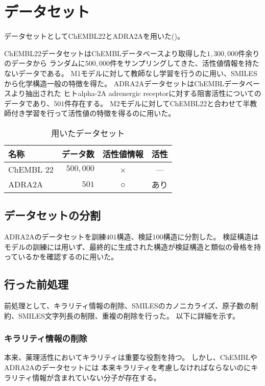 \section{データセット}

データセットとしてChEMBL22とADRA2Aを用いた()。

ChEMBL22データセットはChEMBLデータベース\cite{chembl22}より取得した$1,300,000$件余りのデータから
ランダムに$500,000$件をサンプリングしてきた、活性値情報を持たないデータである。
M1モデルに対して教師なし学習を行うのに用い、SMILESから化学構造一般の特徴を得た。
ADRA2AデータセットはChEMBLデータベースより抽出された
ヒトalpha-2A adrenergic receptorに対する阻害活性についてのデータであり、$501$件存在する。
M2モデルに対してChEMBL22と合わせて半教師付き学習を行って活性値の特徴を得るのに用いた。
\begin{table}[tbp]
    \centering
    \caption{用いたデータセット} \label{tb:dataset}
    \begin{tabular}{lrcc}\hline
      名称 & データ数 & 活性値情報 & 活性\\\hline
      ChEMBL 22 & $500,000$ & × & --- \\
      ADRA2A & $501$ & ○ & あり \\\hline
    \end{tabular}
\end{table}

\subsection{データセットの分割}

ADRA2Aのデータセットを訓練$401$構造、検証$100$構造に分割した。
検証構造はモデルの訓練には用いず、最終的に生成された構造が検証構造と類似の骨格を持っているかを確認するのに用いた。

\subsection{行った前処理}

前処理として、キラリティ情報の削除、SMILESのカノニカライズ、原子数の制約、SMILES文字列長の制限、重複の削除を行った。
以下に詳細を示す。

\subsubsection{キラリティ情報の削除}

本来、薬理活性においてキラリティは重要な役割を持つ。
しかし、ChEMBLやADRA2Aのデータセットには
本来キラリティを考慮しなければならないのにキラリティ情報が含まれていない分子が存在する。

